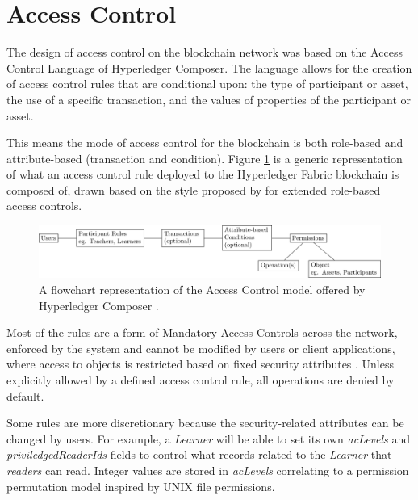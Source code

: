 \section{Access Control}
The design of access control on the blockchain network was based on the Access Control Language of Hyperledger Composer.
The language allows for the creation of access control rules that are conditional upon: the type of participant or asset,
the use of a specific transaction, and the values of properties of the participant or asset.

This means the mode of access control for the blockchain is both role-based and attribute-based (transaction and condition).
Figure \ref{fig:ac_model} is a generic representation of what an access control rule deployed to the Hyperledger Fabric blockchain is composed of,
drawn based on the style proposed by \citet{poniszewska2005representation} for extended role-based access controls.\\

\begin{figure}[!ht]
	\centering
	\includegraphics[width=1.0\textwidth]{ac_model}
	\caption[Access Control Model of Hyperledger Composer]
	{A flowchart representation of the Access Control model offered by Hyperledger Composer \citep{official2018composer}.}
	\label{fig:ac_model}
\end{figure}

Most of the rules are a form of Mandatory Access Controls across the network, enforced by the system and cannot be modified by
users or client applications, where access to objects is restricted based on fixed security attributes \citep{yuan2005attributed}.
Unless explicitly allowed by a defined access control rule, all operations are denied by default.

Some rules are more discretionary because the security-related attributes can be changed by users.
For example, a \textit{Learner} will be able to set its own \textit{acLevels} and \textit{priviledgedReaderIds} fields to control
what records related to the \textit{Learner} that \textit{readers} can read. Integer values are stored in \textit{acLevels} correlating to
a permission permutation model inspired by UNIX file permissions.

